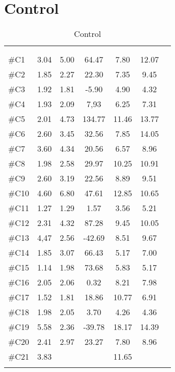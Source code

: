 \section{Control}
\begin{longtable} {l|c|c|c|c|c|c}
 \rowcolor[HTML]{C0C0C0} 
  \color[HTML]{000000}{} & 
 \multicolumn{3}{c|}{ \color[HTML]{000000}{\textbf{Threshold}}} & \multicolumn{3}{c}{ \color[HTML]{000000}{\textbf{Tolerance}}}  	\\  \rule{0pt}{3ex} 
  \cellcolor[HTML]{C0C0C0}{} &
 \multicolumn{1}{c|}{ \cellcolor[HTML]{C0C0C0}{Pre [KgF]}} & \multicolumn{1}{c|}{ \cellcolor[HTML]{C0C0C0}{Post [KgF]}} 
 & \multicolumn{1}{c}{ \cellcolor[HTML]{C0C0C0}{\textcolor[HTML]{C0C0C0}{0}Diff [\%]\textcolor[HTML]{C0C0C0}{0}}}
 & \multicolumn{1}{|c|}{ \cellcolor[HTML]{C0C0C0}{Pre [KgF]}} 
 & \multicolumn{1}{c|}{ \cellcolor[HTML]{C0C0C0}{Post [KgF]}} 
 & \multicolumn{1}{c}{ \cellcolor[HTML]{C0C0C0}{\textcolor[HTML]{C0C0C0}{0}Diff [\%]\textcolor[HTML]{C0C0C0}{0}}}  	\\ \hline   
\#C1 & 3.04	& 5.00	&	64.47	& 7.80	& 	12.07 &	\\ \hline
\#C2 & 1.85 	& 2.27	&	22.30	& 7.35	& 	9.45 &	\\ \hline
\#C3 & 1.92 	& 1.81	&	-5.90	& 4.90	& 	4.32 &	\\ \hline
\#C4 & 1.93 	& 2.09	&	7,93		& 6.25	&	7.31 &	\\ \hline
\#C5 & 2.01 	& 4.73 	& 	134.77	& 11.46		& 13.77 &		\\ \hline
\#C6 & 2.60 	& 3.45	& 	32.56		& 7.85	& 14.05 & 		\\ \hline	
\#C7 & 3.60 & 4.34	& 	20.56		& 6.57 & 8.96  &		\\ \hline
\#C8 & 1.98 & 2.58	& 	29.97		& 10.25	& 10.91 &		\\ \hline
\#C9 & 2.60 & 3.19 	& 	22.56		& 8.89	& 9.51 & 		\\ \hline
\#C10 & 4.60 & 6.80	& 	47.61		& 12.85	& 10.65 & \\ \hline
\#C11 & 1.27 & 1.29 	& 	1.57		& 3.56	& 5.21 & \\ \hline
\#C12 & 2.31 & 4.32 	& 	87.28	& 9.45 & 10.05 &\\ \hline
\#C13 & 4,47 & 2.56 	& 	-42.69	& 8.51 & 9.67 & \\ \hline
\#C14 & 1.85 & 3.07 & 	66.43	 & 5.17 & 7.00 & \\ \hline
\#C15 & 1.14 & 1.98 & 	73.68 & 5.83 & 5.17 & \\ \hline
\#C16 & 2.05 & 2.06 & 	0.32 & 8.21 & 7.98 &\\ \hline
\#C17 & 1.52 & 1.81 &	18.86 & 10.77 & 6.91 & \\ \hline
\#C18 & 1.98 & 2.05 & 	3.70 & 4.26  &  4.36 &\\ \hline
\#C19 & 5.58 & 2.36 & 	-39.78 & 18.17 & 14.39 & \\ \hline
\#C20 & 2.41 & 2.97 &  23.27 & 7.80 &  8.96 &\\ \hline
\#C21 & 3.83 &  &  & 11.65 & & \\ \hline
	\caption{Control}
	\label{tab:Control}
\end{longtable}
\vspace{-.5cm}



